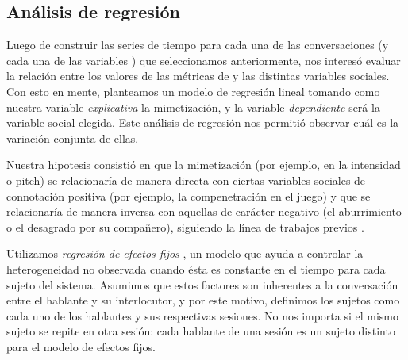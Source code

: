 \subsection{Análisis de regresión}

Luego de construir las series de tiempo para cada una de las conversaciones (y cada una de las variables \ap) que seleccionamos anteriormente, nos interesó evaluar la relación entre los valores de las métricas de  \entrainment y las distintas variables sociales. Con esto en mente, planteamos un modelo de regresión lineal tomando como nuestra variable \emph{explicativa} la mimetización, y la variable \emph{dependiente} será la variable social elegida. Este análisis de regresión nos permitió observar cuál es la variación conjunta de ellas.

Nuestra hipotesis consistió en que la mimetización (por ejemplo, en la intensidad o pitch) se relacionaría de manera directa con ciertas variables sociales de connotación positiva (por ejemplo, la compenetración en el juego) y que se relacionaría de manera inversa con aquellas de carácter negativo (el aburrimiento o el desagrado por su compañero), siguiendo la línea de trabajos previos \cite{gravano2015backward}.

Utilizamos \emph{regresión de efectos fijos} \cite[chap 16]{gujarati1999}, un modelo que ayuda a controlar la heterogeneidad no observada cuando ésta es constante en el tiempo para cada sujeto del sistema. Asumimos que estos factores son inherentes a la conversación entre el hablante y su interlocutor, y por este motivo, definimos los sujetos como cada uno de los hablantes y sus respectivas sesiones. No nos importa si el mismo sujeto se repite en otra sesión: cada hablante de una sesión es un sujeto distinto para el modelo de efectos fijos.
